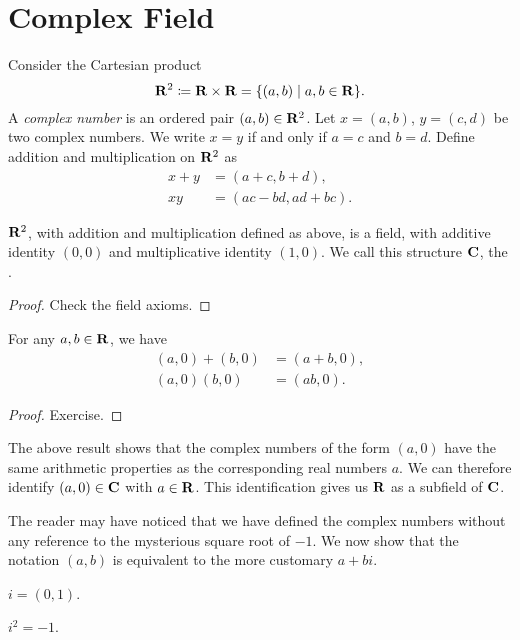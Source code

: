 \section{Complex Field}
Consider the Cartesian product
\[\mathbf R^2\coloneqq\mathbf R\times\mathbf R=\{(a,b)\mid a,b\in\mathbf R\}.\]
A \emph{complex number} is an ordered pair $(a,b)\in\mathbf R^2$. Let $x=(a,b)$, $y=(c,d)$ be two complex numbers. We write $x=y$ if and only if $a=c$ and $b=d$. Define addition and multiplication on $\mathbf R^2$ as
\begin{align*}
x+y&=(a+c,b+d),\\
xy&=(ac-bd,ad+bc).
\end{align*}

\begin{proposition}
$\mathbf R^2$, with addition and multiplication defined as above, is a field, with additive identity $(0,0)$ and multiplicative identity $(1,0)$. We call this structure $\mathbf C$, the .
\end{proposition}

\begin{proof}
Check the field axioms.
\end{proof}

\begin{proposition}
For any $a,b\in\mathbf R$, we have
\begin{align*}
(a,0)+(b,0)&=(a+b,0),\\
(a,0)(b,0)&=(ab,0).
\end{align*}
\end{proposition}

\begin{proof}
Exercise.
\end{proof}

The above result shows that the complex numbers of the form $(a,0)$ have the same arithmetic properties as the corresponding real numbers $a$. We can therefore identify $(a,0)\in\mathbf C$ with $a\in\mathbf R$. This identification gives us $\mathbf R$ as a subfield of $\mathbf C$.

The reader may have noticed that we have defined the complex numbers without any reference to the mysterious square root of $-1$. We now show that the notation $(a,b)$ is equivalent to the more customary $a+bi$.

\begin{definition}
$i=(0,1)$.
\end{definition}

\begin{proposition}
$i^2=-1$.
\end{proposition}

